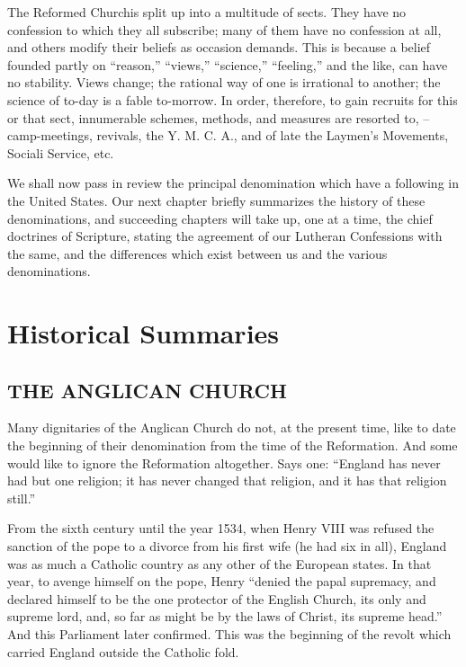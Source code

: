 \documentclass[
]{book}
\begin{document}
The Reformed Churchis split up into a multitude of sects. They have no confession to which they all subscribe; many of them have no confession at all, and others modify their beliefs as occasion demands. This is because a belief founded partly on ``reason,'' ``views,'' ``science,'' ``feeling,'' and the like, can have no stability. Views change; the rational way of one is irrational to another; the science of to-day is a fable to-morrow. In order, therefore, to gain recruits for this or that sect, innumerable schemes, methods, and measures are resorted to, -- camp-meetings, revivals, the Y. M. C. A., and of late the Laymen's Movements, Sociali Service, etc.

We shall now pass in review the principal denomination which have a following in the United States. Our next chapter briefly summarizes the history of these denominations, and succeeding chapters will take up, one at a time, the chief doctrines of Scripture, stating the agreement of our Lutheran Confessions with the same, and the differences which exist between us and the various denominations.

\hypertarget{historical-summaries}{%
\section{Historical Summaries}\label{historical-summaries}}

\hypertarget{the-anglican-church}{%
\subsection{THE ANGLICAN CHURCH}\label{the-anglican-church}}

Many dignitaries of the Anglican Church do not, at the present time, like to date the beginning of their denomination from the time of the Reformation. And some would like to ignore the Reformation altogether. Says one: ``England has never had but one religion; it has never changed that religion, and it has that religion still.''

From the sixth century until the year 1534, when Henry VIII was refused the sanction of the pope to a divorce from his first wife (he had six in all), England was as much a Catholic country as any other of the European states. In that year, to avenge himself on the pope, Henry ``denied the papal supremacy, and declared himself to be the one protector of the English Church, its only and supreme lord, and, so far as might be by the laws of Christ, its supreme head.'' And this Parliament later confirmed. This was the beginning of the revolt which carried England outside the Catholic fold.
\end{document}
